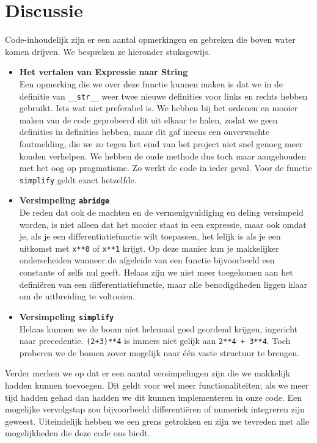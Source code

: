 \documentclass[12pt]{article}
\begin{document}
\section{Discussie}
Code-inhoudelijk zijn er een aantal opmerkingen en gebreken die boven water komen drijven. We bespreken ze  hieronder stuksgewijs. 
\begin{itemize}
\item \textbf{Het vertalen van Expressie naar String}\\
Een opmerking die we over deze functie kunnen maken is dat we in de definitie van \texttt{\_\_str\_\_} weer twee nieuwe definities voor links en rechts hebben gebruikt. Iets wat niet preferabel is. We hebben bij het ordenen en mooier maken van de code geprobeerd dit uit elkaar te halen, zodat we geen definities in definities hebben, maar dit gaf ineens een onverwachte foutmelding, die we zo tegen het eind van het project niet snel genoeg meer konden verhelpen. We hebben de oude methode dus toch maar aangehouden met het oog op pragmatisme. Zo werkt de code in ieder geval. Voor de functie \texttt{simplify} geldt exact hetzelfde.
\item \textbf{Versimpeling \texttt{abridge}}\\
De reden dat ook de machten en de vermenigvuldiging en deling versimpeld worden, is niet alleen dat het mooier staat in een expressie, maar ook omdat je, als je een differentiatiefunctie wilt toepassen, het lelijk is als je een uitkomst met \texttt{x**0} of \texttt{x**1} krijgt. Op deze manier kun je makkelijker onderscheiden wanneer de afgeleide van een functie bijvoorbeeld een constante of zelfs nul geeft. Helaas zijn we niet meer toegekomen aan het defini\"eren van een differentiatiefunctie, maar alle benodigdheden liggen klaar om de uitbreiding te voltooien.
\item \textbf{Versimpeling \texttt{simplify}}\\
Helaas kunnen we de boom niet helemaal goed geordend krijgen, ingericht naar precedentie. \texttt{(2+3)**4} is immers niet gelijk aan \texttt{2**4 + 3**4}. Toch proberen we de  bomen zover mogelijk naar \'e\'en vaste structuur te brengen.
\end{itemize}
\vspace{0.5pc}
Verder merken we op dat er een aantal versimpelingen zijn die we makkelijk hadden kunnen toevoegen. Dit geldt voor wel meer functionaliteiten; als we meer tijd hadden gehad dan hadden we dit kunnen implementeren in onze code. Een mogelijke vervolgstap zou bijvoorbeeld differenti\"eren of numeriek integreren zijn geweest. Uiteindelijk hebben we een grens getrokken en zijn we tevreden met alle mogelijkheden die deze code ons biedt. 
\vspace{1pc}
\end{document}
